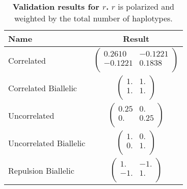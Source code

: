 \documentclass[12pt]{article}
\begin{document}
\begin{table}[H]
  \begin{tabular}{lc} Name & Result \\
    \hline
    Correlated & $\left(\begin{array}{cc}
                          0.2610 & -0.1221 \\
                          -0.1221 &  0.1838 \\
                        \end{array}\right)$ \\
    Correlated Biallelic & $\left(\begin{array}{cc}
                                    1. & 1. \\
                                    1. & 1. \\
                                  \end{array}\right)$ \\
    Uncorrelated & $\left(\begin{array}{cc}
                            0.25 & 0.   \\
                            0.   & 0.25 \\
                          \end{array}\right)$ \\
    Uncorrelated Biallelic & $\left(\begin{array}{cc}
                                      1. & 0. \\
                                      0. & 1. \\
                                    \end{array}\right)$ \\
    Repulsion Biallelic & $\left(\begin{array}{cc}
                                   1. & -1. \\
                                   -1. &  1. \\
                                 \end{array}\right)$ \\
  \end{tabular}
  \caption{
    \textbf{Validation results for $r$.}
    $r$ is polarized and weighted by the total number of haplotypes.
  }
\end{table}
\end{document}
